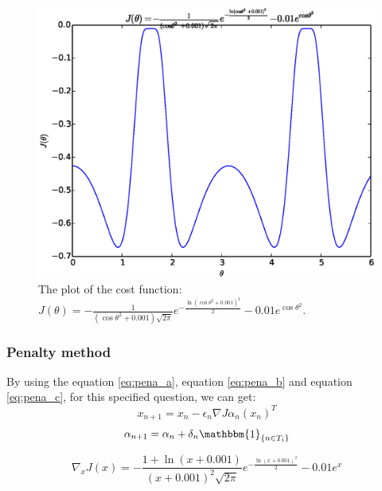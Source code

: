 \documentclass[a4paper,12pt]{article}
\begin{document}
\begin{figure}[H]
\begin{center}
\includegraphics[width=1.0\linewidth]{exponential_sphe.eps}


\end{center}
   \caption{The plot of the cost function: $J(\theta)=-\frac{1}{(\cos \theta ^2+0.001) \sqrt{2 \pi}}e^{-\frac{\ln(\cos \theta ^2+0.001)^2}{2} }-0.01 e^{\cos \theta ^2}$. }
\label{fig:exp_cost_sphe}
\end{figure}





\subsubsection{Penalty method }
 By using the equation \ref{eq:pena_a}, equation \ref{eq:pena_b} and equation \ref{eq:pena_c}, for this specified question, we can get:\\
\begin{equation} \label{eq:pena_exp_a}
x_{n+1}=x_n-\epsilon _n \nabla J{\alpha_ n}(x_n)^T
\end{equation}
\begin{equation}\label{eq:pena_exp_b}
\alpha_{n+1}=\alpha_n+\delta _n \mathbbm{1} _{\{n\in {T_i}\}}
\end{equation}

\begin{equation}\label{eq:pena_exp_c}
\nabla _x J(x) =  -\frac{1+\ln(x+0.001)}{(x+0.001)^2 \sqrt{2 \pi}}e^{-\frac{\ln(x+0.001)^2}{2} }  -0.01 e^x
\end{equation}
\end{document}
